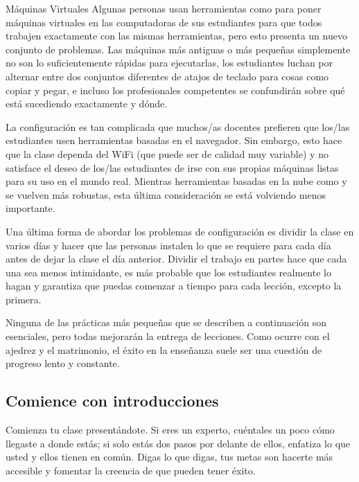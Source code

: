 \begin{aside}{Máquinas Virtuales}
  Algunas personas usan herramientas como 
  para poner máquinas virtuales en las computadoras de sus estudiantes
  para que todos trabajen exactamente con las mismas herramientas,
  pero esto presenta un nuevo conjunto de problemas.
  Las máquinas más antiguas o más pequeñas simplemente no son lo suficientemente rápidas para ejecutarlas,
  los estudiantes luchan por alternar
  entre dos conjuntos diferentes de atajos de teclado para cosas como copiar y pegar,
  e incluso los profesionales competentes se confundirán sobre qué está sucediendo exactamente y dónde.
\end{aside}

La configuración es tan complicada que
muchos/as docentes prefieren que los/las estudiantes usen herramientas basadas en el navegador.
Sin embargo,
esto hace que la clase dependa del WiFi
(que puede ser de calidad muy variable)
y no satisface el deseo de los/las estudiantes de irse con sus propias máquinas listas para su uso en el mundo real.
Mientras herramientas basadas en la nube como 
y  se vuelven más robustas,
esta última consideración se está volviendo menos importante.

Una última forma de abordar los problemas de configuración es dividir la clase en varios días
y hacer que las personas instalen lo que se requiere para cada día
antes de dejar la clase el día anterior.
Dividir el trabajo en partes hace que cada una sea menos intimidante,
es más probable que los estudiantes realmente lo hagan
y garantiza que puedas comenzar a tiempo para cada lección, excepto la primera.


Ninguna de las prácticas más pequeñas que se describen a continuación son esenciales,
pero todas mejorarán la entrega de lecciones.
Como ocurre con el ajedrez y el matrimonio,
el éxito en la enseñanza suele ser una cuestión de progreso lento y constante.

\subsection*{Comience con introducciones}

Comienza tu clase presentándote.
Si eres un experto,
cuéntales un poco cómo llegaste a donde estás;
si solo estás dos pasos por delante de ellos,
enfatiza lo que usted y ellos tienen en común.
Digas lo que digas,
tus metas son hacerte más accesible
y fomentar la creencia de que pueden tener éxito.

